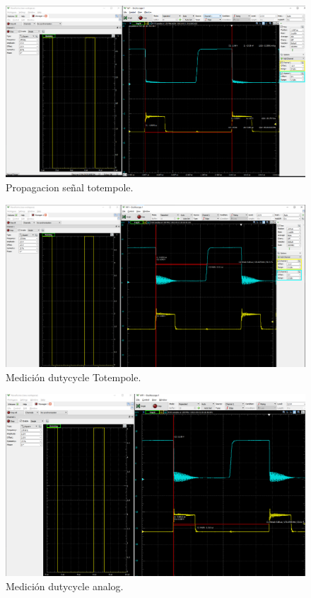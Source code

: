 \begin{figure}[H]
	\centering
	\includegraphics[width=\linewidth]{Imagenes/V_A_V_TTpole}
	\caption{Propagacion señal totempole.}
	\label{fig:VAVTTP}
\end{figure}
\begin{figure}[H]
	\centering
	\includegraphics[width=\linewidth]{Imagenes/V_A_V_TTpole_detalle_1}
	\caption{Medición  dutycycle Totempole.}
	\label{fig:MED_TTP}
\end{figure}
\begin{figure}[H]
	\centering
	\includegraphics[width=\linewidth]{Imagenes/V_A_V_TTpole_detalle_2}
	\caption{Medición  dutycycle analog.}
	\label{fig:MED_ANAL}
\end{figure}


